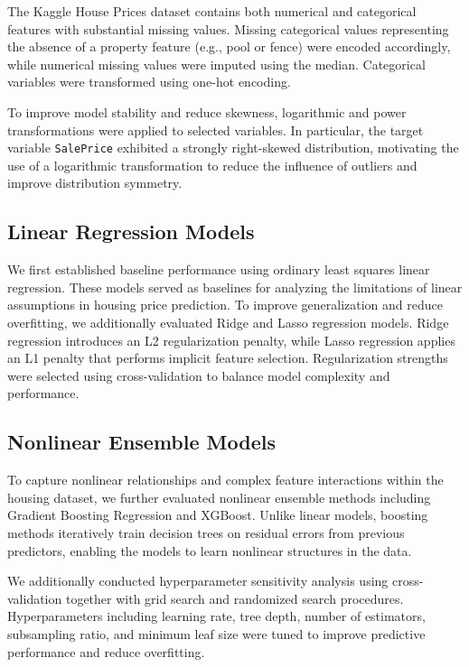 \documentclass{article}
\begin{document}
The Kaggle House Prices dataset contains both numerical and categorical features with substantial missing values. Missing categorical values representing the absence of a property feature (e.g., pool or fence) were encoded accordingly, while numerical missing values were imputed using the median. Categorical variables were transformed using one-hot encoding.

To improve model stability and reduce skewness, logarithmic and power transformations were applied to selected variables. In particular, the target variable \texttt{SalePrice} exhibited a strongly right-skewed distribution, motivating the use of a logarithmic transformation to reduce the influence of outliers and improve distribution symmetry.

\subsection{Linear Regression Models}

We first established baseline performance using ordinary least squares linear regression. These models served as  baselines for analyzing the limitations of linear assumptions in housing price prediction.
To improve generalization and reduce overfitting, we additionally evaluated Ridge and Lasso regression models. Ridge regression introduces an L2 regularization penalty, while Lasso regression applies an L1 penalty that performs implicit feature selection. Regularization strengths were selected using cross-validation to balance model complexity and performance.

\subsection{Nonlinear Ensemble Models}

To capture nonlinear relationships and complex feature interactions within the housing dataset, we further evaluated nonlinear ensemble methods including Gradient Boosting Regression and XGBoost. Unlike linear models, boosting methods iteratively train decision trees on residual errors from previous predictors, enabling the models to learn nonlinear structures in the data.

 We additionally conducted hyperparameter sensitivity analysis using cross-validation together with grid search and randomized search procedures. Hyperparameters including learning rate, tree depth, number of estimators, subsampling ratio, and minimum leaf size were tuned to improve predictive performance and reduce overfitting.
\end{document}
